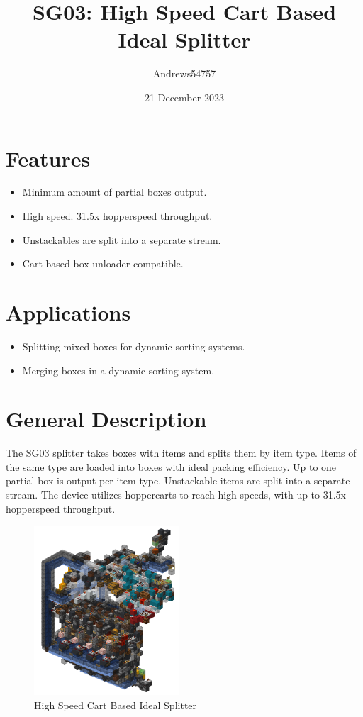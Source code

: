 \documentclass[10pt]{datasheet}
\title{SG03: High Speed Cart Based Ideal Splitter}
\author{Andrews54757}
\date{21 December 2023}
\begin{document}
\maketitle

\section{Features}

\begin{itemize}
\item{Minimum amount of partial boxes output.}
\item{High speed. 31.5x hopperspeed throughput.}
\item{Unstackables are split into a separate stream.}
\item{Cart based box unloader compatible.}
\end{itemize}

\section{Applications}

\begin{itemize}
\item{Splitting mixed boxes for dynamic sorting systems.}
\item{Merging boxes in a dynamic sorting system.}
\end{itemize}

\section{General Description}
The SG03 splitter takes boxes with items and splits them by item type. Items of the same type are loaded into boxes with ideal packing efficiency. Up to one partial box is output per item type. Unstackable items are split into a separate stream. The device utilizes hoppercarts to reach high speeds, with up to 31.5x hopperspeed throughput.

\vfill\break

\begin{figure}[h]
    \centering
    \includegraphics[width=0.48\textwidth]{asdadad.png}
    \caption{\centering High Speed Cart Based Ideal Splitter}
\end{figure}
\end{document}
